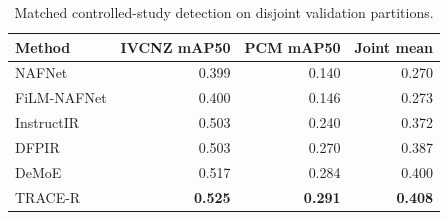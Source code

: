 \begin{table}[!t]
\centering
\caption{Matched controlled-study detection on disjoint validation partitions.}
\label{tab:controlled_summary}
\footnotesize
\setlength{\tabcolsep}{3.7pt}
\begin{tabular}{lrrr}
\toprule
Method & IVCNZ mAP50 & PCM mAP50 & Joint mean \\
\midrule
NAFNet & 0.399 & 0.140 & 0.270 \\
FiLM-NAFNet & 0.400 & 0.146 & 0.273 \\
InstructIR & 0.503 & 0.240 & 0.372 \\
DFPIR & 0.503 & 0.270 & 0.387 \\
DeMoE & 0.517 & 0.284 & 0.400 \\
TRACE-R & \textbf{0.525} & \textbf{0.291} & \textbf{0.408} \\
\bottomrule
\end{tabular}
\end{table}
